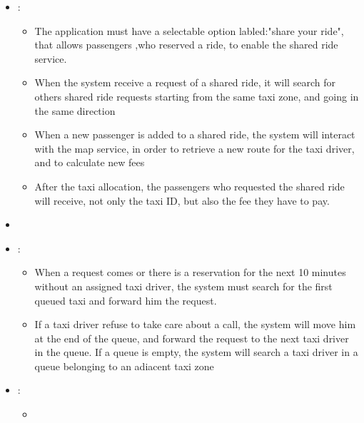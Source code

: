 \begin {itemize}
\begin{itemize}
	\item Ten minutes before the ride starts, the system allocates a taxi for it.
	\end{itemize}
\item [G4]:%
	\begin{itemize}
	\item The application must have a selectable option labled:"share your ride", that allows passengers ,who reserved a ride, to enable the shared ride service.
	\item When the system receive a request of a shared ride, it will search for others shared ride requests starting from the same taxi zone, and going in the same direction %
	\item When a new passenger is added to a shared ride, the system will interact with the map service, in order to retrieve a new route for the taxi driver, and to calculate new fees
	\item After the taxi allocation, the passengers who requested the shared ride will receive, not only the taxi ID, but also the fee they have to pay.
	\end{itemize}
\item [G5] %

\item[G6]:
	\begin{itemize}
	\item When a request comes or there is a reservation for the next 10 minutes without an assigned taxi driver, the system must search for the first queued taxi and forward him the request.
	\item If a taxi driver refuse to take care about a call, the system will move him at the end of the queue, and forward the request to the next taxi driver in the queue. If a queue is empty, the system will search a taxi driver in a queue belonging to an adiacent taxi zone %
	\end{itemize}
\item [G7]:
	\begin{itemize}
	\item
	\end{itemize}
\end {itemize}
